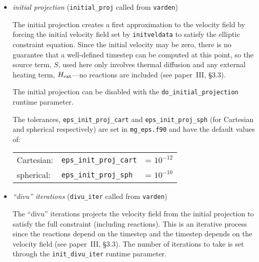 \begin{itemize}

\item {\em initial projection} ({\tt initial\_proj} called from {\tt varden})

  The initial projection creates a first approximation to the velocity
  field by forcing the initial velocity field set by {\tt initveldata}
  to satisfy the elliptic constraint equation.  Since the initial
  velocity may be zero, there is no guarantee that a well-defined
  timestep can be computed at this point, so the source term, $S$,
  used here only involves thermal diffusion and any external heating
  term, ${H_{\rm ext}}$---no reactions are included (see paper~III, \S 3.3).

  The initial projection can be disabled with the {\tt do\_initial\_projection}
  runtime parameter.

  The tolerances, {\tt eps\_init\_proj\_cart} and {\tt eps\_init\_proj\_sph}
  (for Cartesian and spherical respectively) are set in {\tt mg\_eps.f90}
  and have the default values of:
   \begin{center}
   \begin{tabular}{lll}
   Cartesian:   &  {\tt eps\_init\_proj\_cart} &= $10^{-12}$ \\
   spherical:   &  {\tt eps\_init\_proj\_sph}  &= $10^{-10}$
   \end{tabular}
   \end{center}


\item {\em ``divu'' iterations} ({\tt divu\_iter} called from {\tt varden})

  The ``divu'' iterations projects the velocity field from the initial
  projection to satisfy the full constraint (including reactions).
  This is an iterative process since the reactions depend on the
  timestep and the timestep depends on the velocity field (see
  paper~III, \S 3.3).  The number of iterations to take is set through
  the {\tt init\_divu\_iter} runtime parameter.


\end{itemize}
